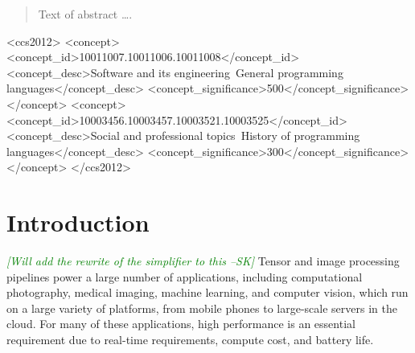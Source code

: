 \documentclass[sigplan,review,anonymous]{acmart}\settopmatter{printfolios=true,printccs=false,printacmref=false}
\newcommand{\sak}[1]{\textcolor{green}{\textit{[{#1} --SK]}}}
\begin{document}
\begin{abstract}
Text of abstract \ldots.
\end{abstract}


\begin{CCSXML}
<ccs2012>
<concept>
<concept_id>10011007.10011006.10011008</concept_id>
<concept_desc>Software and its engineering~General programming languages</concept_desc>
<concept_significance>500</concept_significance>
</concept>
<concept>
<concept_id>10003456.10003457.10003521.10003525</concept_id>
<concept_desc>Social and professional topics~History of programming languages</concept_desc>
<concept_significance>300</concept_significance>
</concept>
</ccs2012>
\end{CCSXML}





\maketitle


\section{Introduction}
\sak{Will add the rewrite of the simplifier to this}
Tensor and image processing pipelines power a large number of applications,
including computational photography, medical imaging, machine learning,
and computer vision, which run on a large variety of platforms, from
mobile phones to large-scale servers in the cloud.  For many of these
applications, high performance is an essential requirement due to real-time
requirements, compute cost, and battery life.
\end{document}
